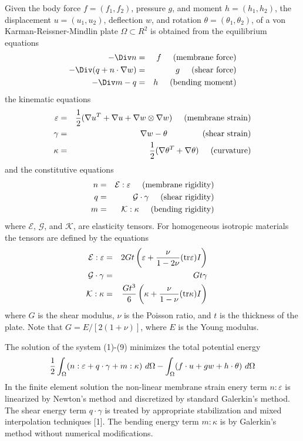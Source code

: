 \begin{versiona}
Given the body force $f=(f_1,f_2)$, pressure $g$, and moment
$h=(h_1,h_2)$, the displacement $u=(u_1,u_2)$, deflection $w$,
and rotation $\theta=(\theta_1,\theta_2)$, of a von Karman-Reissner-Mindlin
plate $\Omega \subset R^2$ is obtained from the equilibrium equations
\begin{eqnarray}
-\Div n & = & f \hskip5truemm (\mathrm{membrane \ force}) \\
-\Div(q + n\cdot \nabla w) & = & g \hskip5truemm (\mathrm{shear \ force}) \\
-\Div m - q & = & h \hskip5truemm (\mathrm{bending \ moment}) 
\end{eqnarray}
the kinematic equations
\begin{eqnarray}
\varepsilon & = & {1\over 2}(\nabla u^T + \nabla u + \nabla w \otimes \nabla w) 
\hskip5truemm (\mathrm{membrane \ strain}) \\
\gamma & = & \nabla w - \theta \hskip15truemm (\mathrm{shear \ strain}) \\
\kappa & = & {1\over 2}(\nabla \theta^T + \nabla \theta) 
\hskip5truemm (\mathrm{curvature}) 
\end{eqnarray}
and the constitutive equations
\begin{eqnarray}
n & = & \mathcal E : \varepsilon \hskip5truemm (\mathrm{membrane \ rigidity}) \\
q & = & \mathcal G \cdot \gamma \hskip5truemm (\mathrm{shear \ rigidity}) \\
m & = & \mathcal K : \kappa \hskip5truemm (\mathrm{bending \  rigidity}) 
\end{eqnarray}
where $\mathcal E$, $\mathcal G$, and $\mathcal K$, are elasticity tensors.
For homogeneous isotropic materials the tensors are defined by the equations
\begin{eqnarray}
\mathcal E : \varepsilon &=& 2Gt \left( \varepsilon 
+ {\nu\over 1-2\nu}(\mathrm{tr}\varepsilon) I \right) \hskip5truemm  \\
\mathcal G \cdot \gamma &=& Gt \gamma \hskip5truemm  \\
\mathcal K : \kappa &=& {Gt^3\over 6}\left( \kappa + {\nu\over 1-\nu}
(\mathrm{tr}\kappa) I\right) \hskip5truemm 
\end{eqnarray}
where $G$ is the shear modulus, $\nu$ is the Poisson ratio, and $t$
is the thickness of the plate. Note that $G=E/[2(1+\nu)]$, where $E$
is the Young modulus.

The solution of the system (1)-(9) minimizes the total potential energy
\begin{equation}
{1\over 2}\int_\Omega (n:\varepsilon + q\cdot\gamma + m:\kappa ) \ d\Omega
- \int_\Omega (f\cdot u + gw + h\cdot\theta) \ d\Omega
\end{equation}
In the finite element solution the non-linear membrane strain enery
term $n:\varepsilon$ is linearized by Newton's method and discretized
by standard Galerkin's method. The shear energy term $q\cdot\gamma$ is
treated by appropriate stabilization and mixed interpolation techniques [1].
The bending energy term $m:\kappa$ is by Galerkin's method without numerical
modifications.

\end{versiona}

